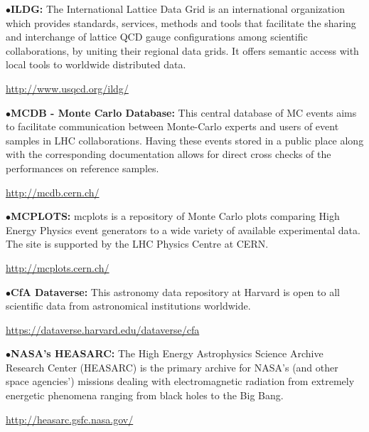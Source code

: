 \item{$\bullet$}{\bf ILDG:} 
The International Lattice Data Grid is an international organization which provides standards, services, methods and tools that facilitate the sharing and interchange of lattice QCD gauge configurations among scientific collaborations, by uniting their regional data grids. It offers semantic access with local tools to worldwide distributed data.
	\item{}\qquad\url{http://www.usqcd.org/ildg/}

\medskip

\item{$\bullet$}{\bf MCDB - Monte Carlo Database:} 
This central database of MC events aims to facilitate communication between Monte-Carlo experts and users of event samples in LHC collaborations. Having these events stored in a public place along with the corresponding documentation allows for direct cross checks of the performances on reference samples.
	\item{}\qquad\url{http://mcdb.cern.ch/}

\medskip

\item{$\bullet$}{\bf MCPLOTS:} 
mcplots is a repository of Monte Carlo plots comparing High Energy Physics event generators to a wide variety of available experimental data. The site is supported by the LHC Physics Centre at CERN.
	\item{}\qquad\url{http://mcplots.cern.ch/}

\medskip
\medskip


\medskip

\item{$\bullet$}{\bf CfA Dataverse:} 
This astronomy data repository at Harvard is open to all scientific data from astronomical institutions worldwide.
	\item{}\qquad\url{https://dataverse.harvard.edu/dataverse/cfa} 


\medskip

\item{$\bullet$}{\bf NASA's HEASARC:} 
The High Energy Astrophysics Science Archive Research Center (HEASARC) is the primary archive for NASA's (and other space agencies') missions dealing with electromagnetic radiation from extremely energetic phenomena ranging from black holes to the Big Bang.
	\item{}\qquad\url{http://heasarc.gsfc.nasa.gov/} 

\medskip

